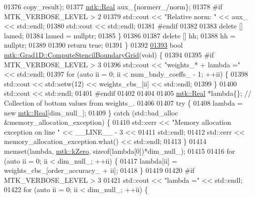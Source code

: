 \begin{DoxyCode}
{{01376                                                         copy\_result);
01377     \hyperlink{group__c01-roots_gac080bbbf5cbb5502c9f00405f894857d}{mtk::Real} aux\_\{normerr\_/norm\};
01378 \textcolor{preprocessor}{    #if MTK\_VERBOSE\_LEVEL > 2}
01379     std::cout << \textcolor{stringliteral}{"Relative norm: "} << aux\_ << std::endl;
01380     std::cout << std::endl;
01381 \textcolor{preprocessor}{    #endif}
01382 
01383     \textcolor{keyword}{delete} [] lamed;
01384     lamed = \textcolor{keyword}{nullptr};
01385   \}
01386 
01387   \textcolor{keyword}{delete} [] hh;
01388   hh = \textcolor{keyword}{nullptr};
01389 
01390   \textcolor{keywordflow}{return} \textcolor{keyword}{true};
01391 \}
01392 
\hypertarget{mtk__grad__1d_8cc_source_l01393}{}\hyperlink{classmtk_1_1Grad1D_a7ad1cecf6b52647263208ffaea0ee1e5}{01393} \textcolor{keywordtype}{bool} \hyperlink{classmtk_1_1Grad1D_a7ad1cecf6b52647263208ffaea0ee1e5}{mtk::Grad1D::ComputeStencilBoundaryGrid}(\textcolor{keywordtype}{void}) \{
01394 
01395 \textcolor{preprocessor}{  #if MTK\_VERBOSE\_LEVEL > 3}
01396   std::cout << \textcolor{stringliteral}{"weights\_* + lambda ="} << std::endl;
01397   \textcolor{keywordflow}{for} (\textcolor{keyword}{auto} ii = 0; ii < num\_bndy\_coeffs\_ - 1; ++ii) \{
01398     std::cout << std::setw(12) << weights\_cbs\_[ii] << std::endl;
01399   \}
01400   std::cout << std::endl;
01401 \textcolor{preprocessor}{  #endif}
01402 
01404 
01405   \hyperlink{group__c01-roots_gac080bbbf5cbb5502c9f00405f894857d}{mtk::Real} *lambda\{\}; \textcolor{comment}{// Collection of bottom values from weights\_.}
01406 
01407   \textcolor{keywordflow}{try} \{
01408     lambda = \textcolor{keyword}{new} \hyperlink{group__c01-roots_gac080bbbf5cbb5502c9f00405f894857d}{mtk::Real}[dim\_null\_];
01409   \} \textcolor{keywordflow}{catch} (std::bad\_alloc &memory\_allocation\_exception) \{
01410     std::cerr << \textcolor{stringliteral}{"Memory allocation exception on line "} << \_\_LINE\_\_ - 3 <<
01411       std::endl;
01412     std::cerr << memory\_allocation\_exception.what() << std::endl;
01413   \}
01414   memset(lambda, \hyperlink{group__c01-roots_ga59a451a5fae30d59649bcda274fea271}{mtk::kZero}, \textcolor{keyword}{sizeof}(lambda[0])*dim\_null\_);
01415 
01416   \textcolor{keywordflow}{for} (\textcolor{keyword}{auto} ii = 0; ii < dim\_null\_; ++ii) \{
01417     lambda[ii] = weights\_cbs\_[order\_accuracy\_ + ii];
01418   \}
01419 
01420 \textcolor{preprocessor}{  #if MTK\_VERBOSE\_LEVEL > 3}
01421   std::cout << \textcolor{stringliteral}{"lambda ="} << std::endl;
01422   \textcolor{keywordflow}{for} (\textcolor{keyword}{auto} ii = 0; ii < dim\_null\_; ++ii) \{
}}
\end{DoxyCode}
